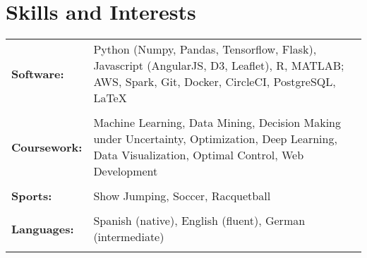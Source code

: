 \documentclass[a4paper,10pt]{article}
\begin{document}









\section{Skills and Interests}
\begin{tabularx}{\textwidth}{lX}
\bf{Software:}& Python (Numpy, Pandas, Tensorflow, Flask), Javascript (AngularJS, D3, Leaflet), R, MATLAB; AWS, Spark, Git, Docker, CircleCI, PostgreSQL, \LaTeX \\ \\ 

 \bf{Coursework:}& Machine Learning, Data Mining, Decision Making under Uncertainty, Optimization, Deep Learning, Data Visualization, Optimal Control, Web Development\\ \\ 

 \bf{Sports:}& Show Jumping, Soccer, Racquetball\\ \\

 \bf{Languages:}& Spanish (native), English (fluent), German (intermediate)\\ \\ 
\end{tabularx}

\nocite{*}


\end{document}
